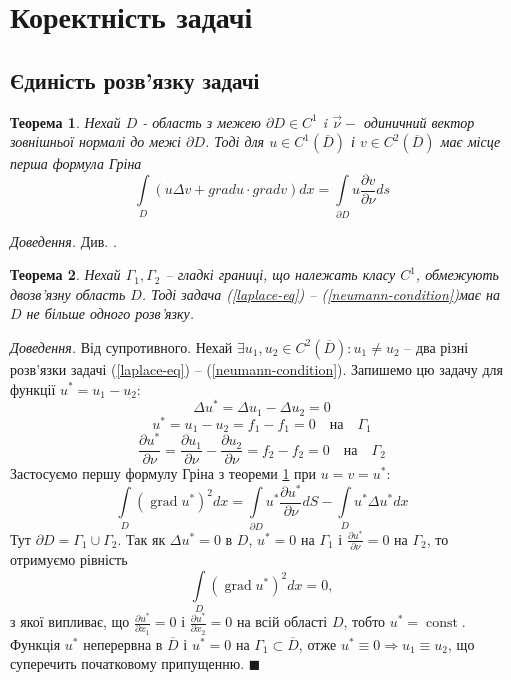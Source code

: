 \documentclass[14pt,a4paper]{extarticle}
\newcounter{e}
\newtheorem{theorem}{Теорема}[section]
\newcommand{\proof}{\textit{Доведення. \space}}
\numberwithin{equation}{section}
\numberwithin{figure}{section}
\newcommand{\intl}{\int\limits}
\begin{document}
\newcommand{\boundprob}{(\ref{laplace-eq}) -- (\ref{neumann-condition})} 
	
	
 \newpage
 \thispagestyle{empty}
 \section{Коректність задачі}
 \subsection{Єдиність розв'язку задачі}
 \begin{theorem}
 \label{green}
 Нехай $D$ - область з межею $\partial D \in C^1$ i $\overrightarrow{\nu} -$ одиничний вектор зовнішньої нормалі до межі $\partial D$. Тоді для $u \in C^1(\overline{D})$ і $v \in C^2(\overline{D})$ має місце перша формула Гріна
 $$
 \intl_{D}(u \Delta v+grad u \cdot grad v) d x=\intl_{\partial D} u \frac{\partial v}{\partial \nu} d s
 $$
\end{theorem}
\proof Див. \cite{kress2012linear}.
  
\begin{theorem}
	\label{single-sol}
	Нехай $\Gamma_{1}, \Gamma_{2}$ -- гладкі границі, що належать класу $C^1$, обмежують двозв'язну область $D$. Тоді задача \boundprob \space має на $D$ не більше одного розв'язку.
\end{theorem}
 
 \proof Від супротивного. Нехай $\exists u_1, u_2 \in C^{2}(\overline{D}): u_1 \neq u_2 $ -- два різні розв'язки задачі \boundprob. Запишемо цю задачу для функції $u^* = u_1 - u_2$:
 $$
 \Delta u^* = \Delta u_1 - \Delta u_2 = 0
 $$
 $$
 u^* = u_1 - u_2 = f_1 - f_1 = 0 \quad \text{на} \quad \Gamma_1
 $$
 $$
 \frac{\partial u^*}{\partial \nu}
 = \frac{\partial u_1}{\partial \nu} - \frac{\partial u_2}{\partial \nu}
 = f_2 - f_2 = 0 \quad \text{на} \quad \Gamma_2
 $$
 Застосуємо першу формулу Гріна з теореми \ref{green} при $u = v = u^*$:
 $$
 \intl_{D}(\operatorname{grad} u^*)^2 dx
 = \intl_{\partial D} u^* \frac{\partial u^*}{\partial \nu} dS
 - \intl_{D} u^* \Delta u^* dx
 $$
 Тут $\partial D = \Gamma_1 \cup \Gamma_2$. Так як $\Delta u^* = 0 $ в $D$, $u^*=0$ на $\Gamma_1$ і $\frac{\partial u^*}{\partial \nu} = 0$ на $\Gamma_2$, то отримуємо рівність
 $$
 \intl_{D}(\operatorname{grad} u^*)^2 dx = 0,
 $$
 з якої випливає, що $\frac{\partial u^*}{\partial x_1} = 0$ і $\frac{\partial u^*}{\partial x_2} = 0$ на всій області $D$, тобто $u^* = \operatorname{const}$. Функція $u^*$ неперервна в $\overline{D}$ і $u^*=0$ на $\Gamma_1 \subset \overline{D}$, отже $u^*\equiv0 \Rightarrow u_1\equiv u_2$, що суперечить початковому припущенню. $\blacksquare$
 
\end{document}
